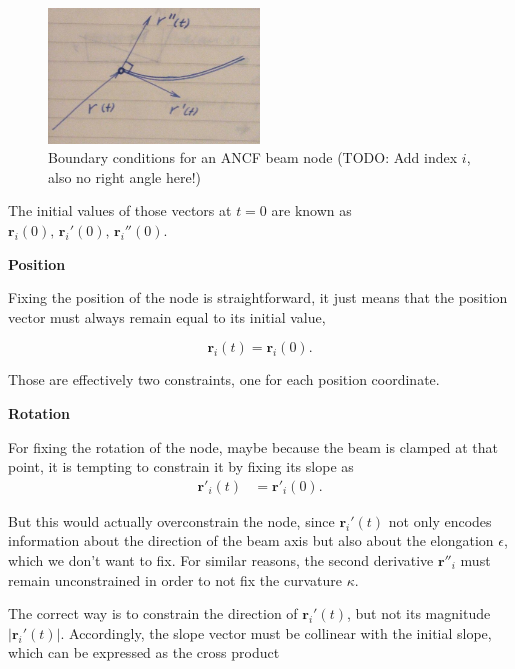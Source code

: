 \begin{figure}[h]
\centering
\includegraphics[width=0.5\textwidth]{figures/elements/beam-element-boundary}
\caption{Boundary conditions for an ANCF beam node (TODO: Add index $i$, also no right angle here!)}
\label{fig:beam-element-boundary}
\end{figure}

The initial values of those vectors at $t = 0$ are known as~$\boldsymbol{r}_{i}(0),\,\boldsymbol{r}_{i}'(0),\,\boldsymbol{r}_{i}''(0)$.

\textbf{Position}

Fixing the position of the node is straightforward, it just means that the position vector must always remain equal to its initial value,

\begin{equation}
\boldsymbol{r}_{i}(t) = \boldsymbol{r}_{i}(0).
\end{equation}

Those are effectively two constraints, one for each position coordinate.

\textbf{Rotation}

For fixing the rotation of the node, maybe because the beam is clamped at that point, it is tempting to constrain it by fixing its slope as
%
\begin{align}
\boldsymbol{r}'_{i}(t) &= \boldsymbol{r}'_{i}(0).
\end{align}

But this would actually overconstrain the node, since $\boldsymbol{r}_{i}'(t)$ not only encodes information about the direction of the beam axis but also about the elongation $\epsilon$, which we don't want to fix.
For similar reasons, the second derivative $\boldsymbol{r}''_{i}$ must remain unconstrained in order to not fix the curvature $\kappa$.

The correct way is to constrain the direction of $\boldsymbol{r}_{i}'(t)$, but not its magnitude $|\boldsymbol{r}_{i}'(t)|$.
Accordingly, the slope vector must be collinear with the initial slope, which can be expressed as the cross product

